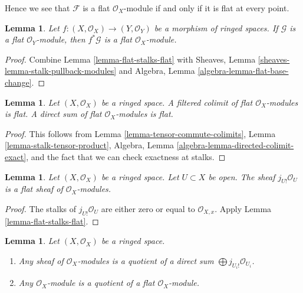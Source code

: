 \documentclass{stacks-project}
\theoremstyle{plain}
\newtheorem{lemma}[subsection]{Lemma}
\theoremstyle{definition}
\theoremstyle{remark}
\numberwithin{equation}{subsection}
\begin{document}
\noindent
Hence we see that $\mathcal{F}$ is a flat $\mathcal{O}_X$-module
if and only if it is flat at every point.

\begin{lemma}
\label{lemma-base-change-flat}
Let $f : (X, \mathcal{O}_X) \to (Y, \mathcal{O}_Y)$
be a morphism of ringed spaces. If $\mathcal{G}$ is a flat
$\mathcal{O}_Y$-module, then $f^*\mathcal{G}$ is a flat
$\mathcal{O}_X$-module.
\end{lemma}

\begin{proof}
Combine Lemma \ref{lemma-flat-stalks-flat} with
Sheaves, Lemma \ref{sheaves-lemma-stalk-pullback-modules} and
Algebra, Lemma \ref{algebra-lemma-flat-base-change}.
\end{proof}

\begin{lemma}
\label{lemma-colimits-flat}
Let $(X, \mathcal{O}_X)$ be a ringed space.
A filtered colimit of flat $\mathcal{O}_X$-modules is flat.
A direct sum of flat $\mathcal{O}_X$-modules is flat.
\end{lemma}

\begin{proof}
This follows from
Lemma \ref{lemma-tensor-commute-colimits},
Lemma \ref{lemma-stalk-tensor-product},
Algebra, Lemma \ref{algebra-lemma-directed-colimit-exact},
and the fact that we can check exactness at stalks.
\end{proof}

\begin{lemma}
\label{lemma-j-shriek-flat}
Let $(X, \mathcal{O}_X)$ be a ringed space.
Let $U \subset X$ be open. The sheaf $j_{U!}\mathcal{O}_U$
is a flat sheaf of $\mathcal{O}_X$-modules.
\end{lemma}

\begin{proof}
The stalks of $j_{U!}\mathcal{O}_U$ are either zero or equal
to $\mathcal{O}_{X, x}$. Apply
Lemma \ref{lemma-flat-stalks-flat}.
\end{proof}

\begin{lemma}
\label{lemma-module-quotient-flat}
Let $(X, \mathcal{O}_X)$ be a ringed space.
\begin{enumerate}
\item Any sheaf of $\mathcal{O}_X$-modules is a quotient of
a direct sum $\bigoplus j_{U_i!}\mathcal{O}_{U_i}$.
\item Any $\mathcal{O}_X$-module is a quotient of
a flat $\mathcal{O}_X$-module.
\end{enumerate}
\end{lemma}
\end{document}
